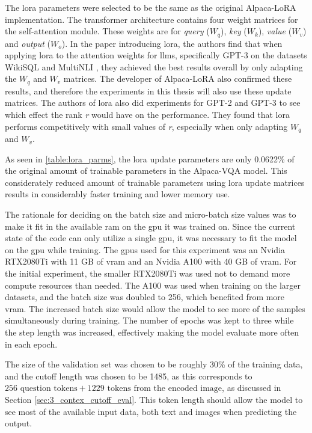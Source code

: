     The \gls{lora} parameters were selected to be the same as the original Alpaca-LoRA implementation. 
    The transformer architecture contains four weight matrices for the self-attention module. These weights are for \textit{query} ($W_q$), \textit{key} ($W_k$), \textit{value} ($W_v$) and \textit{output} ($W_o$).
    In the paper introducing \gls{lora}, the authors find that when applying \gls{lora} to the attention weights for \glspl{llm}, specifically GPT-3 on the datasets WikiSQL \cite{zhongSeq2SQLGeneratingStructured2017} and MultiNLI \cite{williamsBroadCoverageChallengeCorpus2018}, they achieved the best results overall by only adapting the $W_q$ and $W_v$ matrices. The developer of Alpaca-LoRA also confirmed these results, and therefore the experiments in this thesis will also use these update matrices.
    The authors of \gls{lora} also did experiments for GPT-2 and GPT-3 to see which effect the rank \textit{r} would have on the performance. They found that \gls{lora} performs competitively with small values of \textit{r}, especially when only adapting $W_q$ and $W_v$.

    As seen in \autoref{table:lora_parms}, the \gls{lora} update parameters are only 0.0622\% of the original amount of trainable parameters in the Alpaca-VQA model. This considerately reduced amount of trainable parameters using \gls{lora} update matrices results in considerably faster training and lower memory use.

    
    The rationale for deciding on the batch size and micro-batch size values was to make it fit in the available \gls{ram} on the \gls{gpu} it was trained on. Since the current state of the code can only utilize a single \gls{gpu}, it was necessary to fit the model on the \gls{gpu} while training. 
    The \glspl{gpu} used for this experiment was an Nvidia RTX2080Ti with 11 GB of \gls{vram} and an Nvidia A100 with 40 GB of \gls{vram}. For the initial experiment, the smaller RTX2080Ti was used not to demand more compute resources than needed. The A100 was used when training on the larger datasets, and the batch size was doubled to 256, which benefited from more \gls{vram}. The increased batch size would allow the model to see more of the samples simultaneously during training.
    The number of epochs was kept to three while the step length was increased, effectively making the model evaluate more often in each epoch.
    
    The size of the validation set was chosen to be roughly 30\% of the training data, and the cutoff length was chosen to be 1485, as this corresponds to $256 \text{ question tokens} + 1229 \text{ tokens from the encoded image}$, as discussed in Section \ref{sec:3_contex_cutoff_eval}. This token length should allow the model to see most of the available input data, both text and images when predicting the output.

